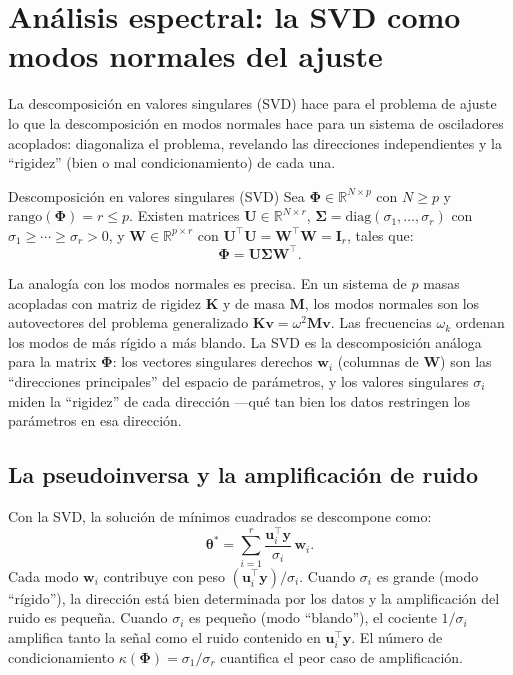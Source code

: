 \section{Análisis espectral: la SVD como modos normales del ajuste}
\label{sec:svd}


La descomposición en valores singulares (SVD) hace para el problema de
ajuste lo que la descomposición en modos normales hace para un sistema
de osciladores acoplados: diagonaliza el problema, revelando las
direcciones independientes y la ``rigidez'' (bien o mal
condicionamiento) de cada una.

\begin{teorema}{Descomposición en valores singulares (SVD)}
\label{thm:svd}
Sea $\bm{\Phi} \in \mathbb{R}^{N \times p}$ con $N \geq p$ y
$\mathrm{rango}(\bm{\Phi}) = r \leq p$. Existen matrices
$\bm{U} \in \mathbb{R}^{N \times r}$,
$\bm{\Sigma} = \text{diag}(\sigma_1, \ldots, \sigma_r)$ con
$\sigma_1 \geq \cdots \geq \sigma_r > 0$, y
$\bm{W} \in \mathbb{R}^{p \times r}$ con
$\bm{U}^\top\bm{U} = \bm{W}^\top\bm{W} = \bm{I}_r$, tales que:
\begin{equation}
  \bm{\Phi} = \bm{U}\bm{\Sigma}\bm{W}^\top.
  \label{eq:svd}
\end{equation}
\end{teorema}

La analogía con los modos normales es precisa. En un sistema de $p$
masas acopladas con matriz de rigidez $\bm{K}$ y de masa $\bm{M}$,
los modos normales son los autovectores del problema generalizado
$\bm{K}\bm{v} = \omega^2\bm{M}\bm{v}$. Las frecuencias $\omega_k$
ordenan los modos de más rígido a más blando. La SVD es la
descomposición análoga para la matrix $\bm{\Phi}$: los vectores
singulares derechos $\bm{w}_i$ (columnas de $\bm{W}$) son las
``direcciones principales'' del espacio de parámetros, y los valores
singulares $\sigma_i$ miden la ``rigidez'' de cada dirección —qué tan
bien los datos restringen los parámetros en esa dirección.

\subsection{La pseudoinversa y la amplificación de ruido}
\label{subsec:pseudoinversa_svd}

Con la SVD, la solución de mínimos cuadrados se descompone como:
\begin{equation}
  \bm{\theta}^* = \sum_{i=1}^r
  \frac{\bm{u}_i^\top\bm{y}}{\sigma_i}\,\bm{w}_i.
  \label{eq:sol_svd}
\end{equation}
Cada modo $\bm{w}_i$ contribuye con peso
$(\bm{u}_i^\top\bm{y})/\sigma_i$. Cuando $\sigma_i$ es grande (modo
``rígido''), la dirección está bien determinada por los datos y la
amplificación del ruido es pequeña. Cuando $\sigma_i$ es pequeño (modo
``blando''), el cociente $1/\sigma_i$ amplifica tanto la señal como el
ruido contenido en $\bm{u}_i^\top\bm{y}$. El número de
condicionamiento $\kappa(\bm{\Phi}) = \sigma_1/\sigma_r$ cuantifica el
peor caso de amplificación.

